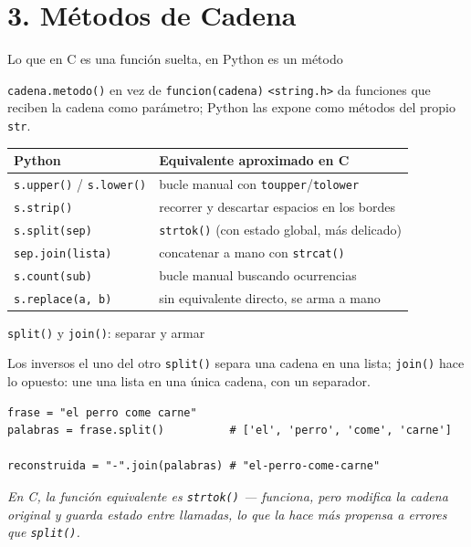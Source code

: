 \documentclass{beamer}
\begin{document}
\section{3. Métodos de Cadena}

\begin{frame}{Lo que en C es una función suelta, en Python es un método}
  \begin{block}{\texttt{cadena.metodo()} en vez de \texttt{funcion(cadena)}}
    \texttt{\textless string.h\textgreater} da funciones que reciben la cadena como parámetro;
    Python las expone como métodos del propio \texttt{str}.
  \end{block}
  \begin{center}
  \renewcommand{\arraystretch}{1.25}
  \begin{tabular}{|l|l|}
    \hline
    \textbf{Python} & \textbf{Equivalente aproximado en C} \\
    \hline \hline
    \texttt{s.upper()} / \texttt{s.lower()} & bucle manual con \texttt{toupper}/\texttt{tolower} \\
    \hline
    \texttt{s.strip()} & recorrer y descartar espacios en los bordes \\
    \hline
    \texttt{s.split(sep)} & \texttt{strtok()} (con estado global, más delicado) \\
    \hline
    \texttt{sep.join(lista)} & concatenar a mano con \texttt{strcat()} \\
    \hline
    \texttt{s.count(sub)} & bucle manual buscando ocurrencias \\
    \hline
    \texttt{s.replace(a, b)} & sin equivalente directo, se arma a mano \\
    \hline
  \end{tabular}
  \end{center}
\end{frame}

\begin{frame}[fragile]{\texttt{split()} y \texttt{join()}: separar y armar}
  \begin{block}{Los inversos el uno del otro}
    \texttt{split()} separa una cadena en una lista; \texttt{join()} hace
    lo opuesto: une una lista en una única cadena, con un separador.
  \end{block}
  \begin{verbatim}
frase = "el perro come carne"
palabras = frase.split()          # ['el', 'perro', 'come', 'carne']

reconstruida = "-".join(palabras) # "el-perro-come-carne"
  \end{verbatim}
  {\footnotesize \textit{En C, la función equivalente es \texttt{strtok()}
  — funciona, pero modifica la cadena original y guarda estado entre
  llamadas, lo que la hace más propensa a errores que \texttt{split()}.}}
\end{frame}
\end{document}
